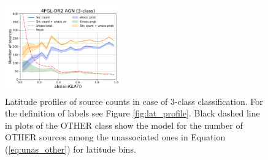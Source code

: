 \begin{figure}[h]
\includegraphics[width=0.45\textwidth]{plots/lat_profile_AGN_4FGL-DR2_3classes.pdf}
\caption{Latitude profiles of source counts in case of 3-class classification. For the definition of labels see Figure \ref{fig:lat_profile}.
Black dashed line in plots of the OTHER class show the model for the number of OTHER sources among the unassociated ones
in Equation (\ref{eq:unas_other}) for latitude bins.}
\label{fig:lat_profile_3class}
\end{figure}


